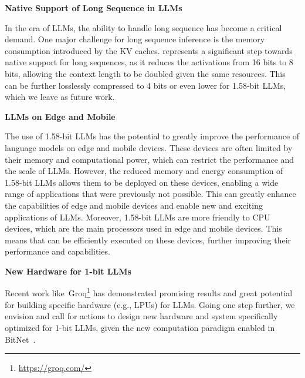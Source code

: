 \textbf{Native Support of Long Sequence in LLMs}

In the era of LLMs, the ability to handle long sequence has become a critical demand. One major challenge for long sequence inference is the memory consumption introduced by the KV caches.  represents a significant step towards native support for long sequences, as it reduces the activations from 16 bits to 8 bits, allowing the context length to be doubled given the same resources. This can be further losslessly compressed to 4 bits or even lower for 1.58-bit LLMs, which we leave as future work.

\textbf{LLMs on Edge and Mobile}

The use of 1.58-bit LLMs has the potential to greatly improve the performance of language models on edge and mobile devices. These devices are often limited by their memory and computational power, which can restrict the performance and the scale of LLMs. However, the reduced memory and energy consumption of 1.58-bit LLMs allows them to be deployed on these devices, enabling a wide range of applications that were previously not possible. This can greatly enhance the capabilities of edge and mobile devices and enable new and exciting applications of LLMs. Moreover, 1.58-bit LLMs are more friendly to CPU devices, which are the main processors used in edge and mobile devices. This means that  can be efficiently executed on these devices, further improving their performance and capabilities.

\textbf{New Hardware for 1-bit LLMs}

Recent work like~Groq\footnote{\url{https://groq.com/}} has demonstrated promising results and great potential for building specific hardware (e.g., LPUs) for LLMs. Going one step further, we envision and call for actions to design new hardware and system specifically optimized for 1-bit LLMs, given the new computation paradigm enabled in BitNet~\cite{bitnet}.

